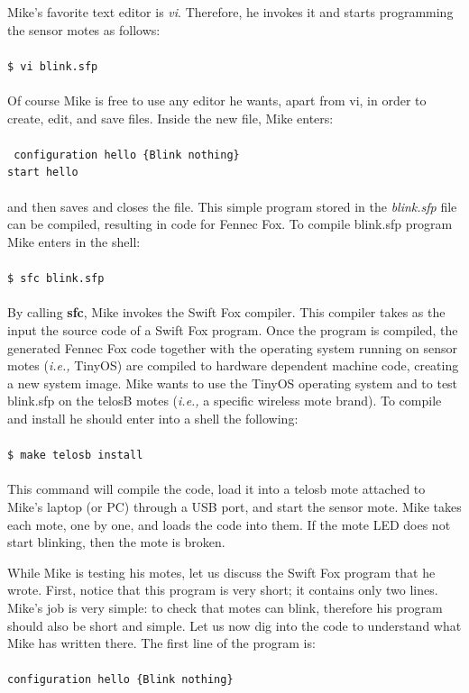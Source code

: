 Mike's favorite text editor is \textit{vi}. Therefore, he invokes it and
starts programming the sensor motes as follows:				\\
\\
\texttt{\$ vi blink.sfp}						\\
\\
Of course Mike is free to use any editor he wants, apart from vi, in
order to create, edit, and save files. Inside the new file, Mike enters:\\ 
\\
\texttt{
configuration hello \{Blink nothing\}					\\
start hello								\\
}
\\
and then saves and closes the file. This simple program stored in the
\textit{blink.sfp} file can be compiled, resulting in code for Fennec Fox.
To compile blink.sfp program Mike enters in the shell:			\\
\\
\texttt{\$ sfc blink.sfp}						\\
\\
By calling \textbf{sfc}, Mike invokes the Swift Fox compiler. This 
compiler takes as the input the source code of a Swift Fox program. Once
the program is compiled, the generated Fennec Fox code together with
the operating system running on sensor motes (\textit{i.e.,} TinyOS) are
compiled to hardware dependent machine code, creating a new system image.
Mike wants to use the TinyOS operating system and to test blink.sfp on the 
telosB motes (\textit{i.e.,} a specific wireless mote brand). To compile
and install he should enter into a shell the following:			\\
\\
\texttt{\$ make telosb install}						\\
\\
This command will compile the code, load it into a telosb mote attached to 
Mike's laptop (or PC) through a USB port, and start the sensor mote. Mike
takes each mote, one by one, and loads the code into them. If the mote LED 
does not start blinking, then the mote is broken.

While Mike is testing his motes, let us discuss the Swift Fox program that 
he wrote. First, notice that this program is very short; it contains only
two lines. Mike's job is very simple: to check that motes can blink,
therefore his program should also be short and simple. Let us now dig into 
the code to understand what Mike has written there. The first line of the
program is:								\\
\\
\texttt{configuration hello \{Blink nothing\}}				\\


